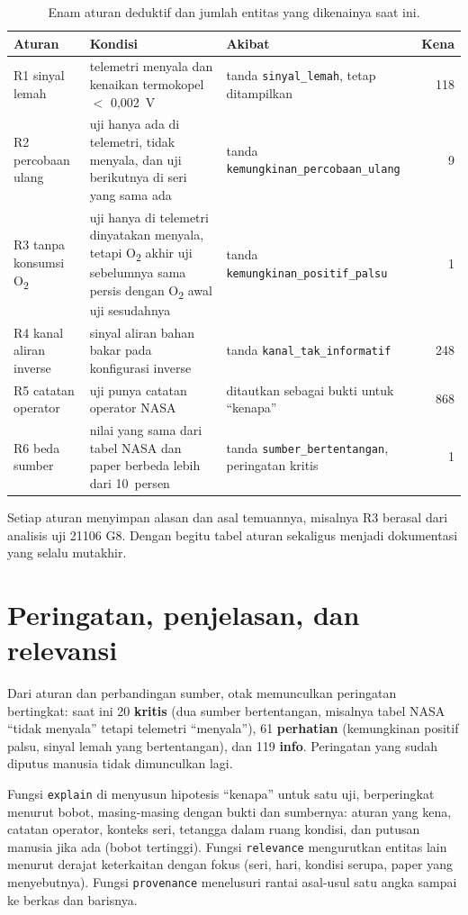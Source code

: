 \documentclass[11pt,a4paper]{report}
\newcommand{\berkas}{\path}                     %
\newcommand{\Od}{O\textsubscript{2}}
\begin{document}
\begin{table}[ht]
\centering\small
\caption{Enam aturan deduktif dan jumlah entitas yang dikenainya saat ini.}
\begin{tabularx}{\linewidth}{@{}l X X r@{}}
\toprule
Aturan & Kondisi & Akibat & Kena\\
\midrule
R1 sinyal lemah & telemetri menyala dan kenaikan termokopel $<$ 0,002~V & tanda \texttt{sinyal\_lemah}, tetap ditampilkan & 118\\
R2 percobaan ulang & uji hanya ada di telemetri, tidak menyala, dan uji berikutnya di seri yang sama ada & tanda \texttt{kemungkinan\_percobaan\_ulang} & 9\\
R3 tanpa konsumsi \Od & uji hanya di telemetri dinyatakan menyala, tetapi \Od{} akhir uji sebelumnya sama persis dengan \Od{} awal uji sesudahnya & tanda \texttt{kemungkinan\_positif\_palsu} & 1\\
R4 kanal aliran inverse & sinyal aliran bahan bakar pada konfigurasi inverse & tanda \texttt{kanal\_tak\_informatif} & 248\\
R5 catatan operator & uji punya catatan operator NASA & ditautkan sebagai bukti untuk ``kenapa'' & 868\\
R6 beda sumber & nilai yang sama dari tabel NASA dan paper berbeda lebih dari 10~persen & tanda \texttt{sumber\_bertentangan}, peringatan kritis & 1\\
\bottomrule
\end{tabularx}
\end{table}

Setiap aturan menyimpan alasan dan asal temuannya, misalnya R3 berasal dari analisis uji 21106 G8.
Dengan begitu tabel aturan sekaligus menjadi dokumentasi yang selalu mutakhir.

\section{Peringatan, penjelasan, dan relevansi}

Dari aturan dan perbandingan sumber, otak memunculkan peringatan bertingkat: saat ini 20
\textbf{kritis} (dua sumber bertentangan, misalnya tabel NASA ``tidak menyala'' tetapi telemetri
``menyala''), 61 \textbf{perhatian} (kemungkinan positif palsu, sinyal lemah yang bertentangan),
dan 119 \textbf{info}. Peringatan yang sudah diputus manusia tidak dimunculkan lagi.

Fungsi \texttt{explain} di \berkas{scripts/brain.py} menyusun hipotesis ``kenapa'' untuk satu uji,
berperingkat menurut bobot, masing-masing dengan bukti dan sumbernya: aturan yang kena, catatan
operator, konteks seri, tetangga dalam ruang kondisi, dan putusan manusia jika ada (bobot
tertinggi). Fungsi \texttt{relevance} mengurutkan entitas lain menurut derajat keterkaitan dengan
fokus (seri, hari, kondisi serupa, paper yang menyebutnya). Fungsi \texttt{provenance} menelusuri
rantai asal-usul satu angka sampai ke berkas dan barisnya.
\end{document}
